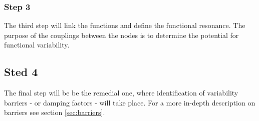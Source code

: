 \subsubsection*{Step 3}
The third step will link the functions and define the functional resonance. The purpose of the couplings between the nodes is to determine the potential for functional variability.


\subsection*{Sted 4}
The final step will be be the remedial one, where identification of variability barriers - or damping factors - will take place. For a more in-depth description on barriers see section \ref{sec:barriers}.

